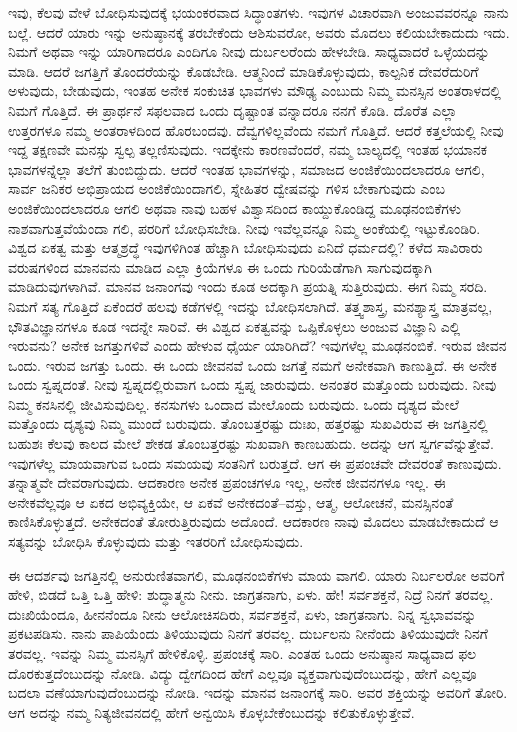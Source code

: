 ಇವು, ಕೆಲವು ವೇಳೆ ಬೋಧಿಸುವುದಕ್ಕೆ ಭಯಂಕರವಾದ ಸಿದ್ಧಾಂತಗಳು. ಇವುಗಳ ವಿಚಾರವಾಗಿ ಅಂಜುವವರನ್ನೂ ನಾನು ಬಲ್ಲೆ. ಆದರೆ ಯಾರು ಇನ್ನು ಅನುಷ್ಠಾನಕ್ಕೆ ತರಬೇಕೆಂದು ಆಶಿಸುವರೋ, ಅವರು ಮೊದಲು ಕಲಿಯಬೇಕಾದುದು ಇದು. ನಿಮಗೆ ಅಥವಾ ಇನ್ನು ಯಾರಿಗಾದರೂ ಎಂದಿಗೂ ನೀವು ದುರ್ಬಲರೆಂದು ಹೇಳಬೇಡಿ. ಸಾಧ್ಯವಾದರೆ ಒಳ್ಳೆಯದನ್ನು ಮಾಡಿ. ಆದರೆ ಜಗತ್ತಿಗೆ ತೊಂದರೆಯನ್ನು ಕೊಡಬೇಡಿ. ಆತ್ಮನಿಂದೆ ಮಾಡಿಕೊಳ್ಳುವುದು, ಕಾಲ್ಪನಿಕ ದೇವರೆದುರಿಗೆ ಅಳುವುದು, ಬೇಡುವುದು, ಇಂತಹ ಅನೇಕ ಸಂಕುಚಿತ ಭಾವಗಳು ಮೌಢ್ಯ ಎಂಬುದು ನಿಮ್ಮ ಮನಸ್ಸಿನ ಅಂತರಾಳದಲ್ಲಿ ನಿಮಗೆ ಗೊತ್ತಿದೆ. ಈ ಪ್ರಾರ್ಥನೆ ಸಫಲವಾದ ಒಂದು ದೃಷ್ಟಾಂತ ವನ್ನಾದರೂ ನನಗೆ ಕೊಡಿ. ದೊರೆತ ಎಲ್ಲಾ ಉತ್ತರಗಳೂ ನಮ್ಮ ಅಂತರಾಳದಿಂದ ಹೊರಬಂದವು. ದೆವ್ವಗಳಿಲ್ಲವೆಂದು ನಮಗೆ ಗೊತ್ತಿದೆ. ಆದರೆ ಕತ್ತಲೆಯಲ್ಲಿ ನೀವು ಇದ್ದ ತಕ್ಷಣವೇ ಮನಸ್ಸು ಸ್ವಲ್ಪ ತಲ್ಲಣಿಸುವುದು. ಇದಕ್ಕೇನು ಕಾರಣವೆಂದರೆ, ನಮ್ಮ ಬಾಲ್ಯದಲ್ಲಿ ಇಂತಹ ಭಯಾನಕ ಭಾವಗಳನ್ನೆಲ್ಲಾ ತಲೆಗೆ ತುಂಬಿದ್ದುದು. ಆದರೆ ಇಂತಹ ಭಾವಗಳನ್ನು, ಸಮಾಜದ ಅಂಜಿಕೆಯಿಂದಲಾದರೂ ಆಗಲಿ, ಸಾರ್ವ ಜನಿಕರ ಅಭಿಪ್ರಾಯದ ಅಂಜಿಕೆಯಿಂದಾಗಲಿ, ಸ್ನೇಹಿತರ ದ್ವೇಷವನ್ನು ಗಳಿಸ ಬೇಕಾಗುವುದು ಎಂಬ ಅಂಜಿಕೆಯಿಂದಲಾದರೂ ಆಗಲಿ ಅಥವಾ ನಾವು ಬಹಳ ವಿಶ್ವಾಸದಿಂದ ಕಾಯ್ದುಕೊಂಡಿದ್ದ ಮೂಢನಂಬಿಕೆಗಳು ನಾಶವಾಗುತ್ತವೆಯೆಂದಾ ಗಲಿ, ಪರರಿಗೆ ಬೋಧಿಸಬೇಡಿ. ನೀವು ಇವೆಲ್ಲವನ್ನೂ ನಿಮ್ಮ ಅಂಕೆಯಲ್ಲಿ ಇಟ್ಟುಕೊಂಡಿರಿ. ವಿಶ್ವದ ಏಕತ್ವ ಮತ್ತು ಆತ್ಮಶ್ರದ್ಧೆ ಇವುಗಳಿಗಿಂತ ಹೆಚ್ಚಾಗಿ ಬೋಧಿಸುವುದು ಏನಿದೆ ಧರ್ಮದಲ್ಲಿ? ಕಳೆದ ಸಾವಿರಾರು ವರುಷಗಳಿಂದ ಮಾನವನು ಮಾಡಿದ ಎಲ್ಲಾ ಕ್ರಿಯೆಗಳೂ ಈ ಒಂದು ಗುರಿಯೆಡೆಗಾಗಿ ಸಾಗುವುದಕ್ಕಾಗಿ ಮಾಡಿದುವುಗಳಾಗಿವೆ. ಮಾನವ ಜನಾಂಗವು ಇಂದು ಕೂಡ ಅದಕ್ಕಾಗಿ ಪ್ರಯತ್ನಿ ಸುತ್ತಿರುವುದು. ಈಗ ನಿಮ್ಮ ಸರದಿ. ನಿಮಗೆ ಸತ್ಯ ಗೊತ್ತಿದೆ ಏಕೆಂದರೆ ಹಲವು ಕಡೆಗಳಲ್ಲಿ ಇದನ್ನು ಬೋಧಿಸಲಾಗಿದೆ. ತತ್ತ್ವಶಾಸ್ತ್ರ, ಮನಶ್ಯಾಸ್ತ್ರ ಮಾತ್ರವಲ್ಲ, ಭೌತವಿಜ್ಞಾನಗಳೂ ಕೂಡ ಇದನ್ನೇ ಸಾರಿವೆ. ಈ ವಿಶ್ವದ ಏಕತ್ವವನ್ನು ಒಪ್ಪಿಕೊಳ್ಳಲು ಅಂಜುವ ವಿಜ್ಞಾನಿ ಎಲ್ಲಿ ಇರುವನು? ಅನೇಕ ಜಗತ್ತುಗಳಿವೆ ಎಂದು ಹೇಳುವ ಧೈರ್ಯ ಯಾರಿಗಿದೆ? ಇವುಗಳೆಲ್ಲ ಮೂಢನಂಬಿಕೆ. ಇರುವ ಜೀವನ ಒಂದು. ಇರುವ ಜಗತ್ತು ಒಂದು. ಈ ಒಂದು ಜೀವನವೆ ಒಂದು ಜಗತ್ತೆ ನಮಗೆ ಅನೇಕವಾಗಿ ಕಾಣುತ್ತಿದೆ. ಈ ಅನೇಕ ಒಂದು ಸ್ವಪ್ನದಂತೆ. ನೀವು ಸ್ವಪ್ನದಲ್ಲಿರುವಾಗ ಒಂದು ಸ್ವಪ್ನ ಜಾರುವುದು. ಅನಂತರ ಮತ್ತೊಂದು ಬರುವುದು. ನೀವು ನಿಮ್ಮ ಕನಸಿನಲ್ಲಿ ಜೀವಿಸುವುದಿಲ್ಲ. ಕನಸುಗಳು ಒಂದಾದ ಮೇಲೊಂದು ಬರುವುದು. ಒಂದು ದೃಶ್ಯದ ಮೇಲೆ ಮತ್ತೊಂದು ದೃಶ್ಯವು ನಿಮ್ಮ ಮುಂದೆ ಬರುವುದು. ತೊಂಬತ್ತರಷ್ಟು ದುಃಖ, ಹತ್ತರಷ್ಟು ಸುಖವಿರುವ ಈ ಜಗತ್ತಿನಲ್ಲಿ ಬಹುಶಃ ಕೆಲವು ಕಾಲದ ಮೇಲೆ ಶೇಕಡ ತೊಂಬತ್ತರಷ್ಟು ಸುಖವಾಗಿ ಕಾಣಬಹುದು. ಅದನ್ನು ಆಗ ಸ್ವರ್ಗವೆನ್ನುತ್ತೇವೆ. ಇವುಗಳೆಲ್ಲ ಮಾಯವಾಗುವ ಒಂದು ಸಮಯವು ಸಂತನಿಗೆ ಬರುತ್ತದೆ. ಆಗ ಈ ಪ್ರಪಂಚವೇ ದೇವರಂತೆ ಕಾಣುವುದು. ತನ್ನಾತ್ಮವೇ ದೇವರಾಗುವುದು. ಆದಕಾರಣ ಅನೇಕ ಪ್ರಪಂಚಗಳೂ ಇಲ್ಲ, ಅನೇಕ ಜೀವನಗಳೂ ಇಲ್ಲ. ಈ ಅನೇಕವೆಲ್ಲವೂ ಆ ಏಕದ ಅಭಿವ್ಯಕ್ತಿಯೇ, ಆ ಏಕವೆ ಅನೇಕದಂತೆ–ವಸ್ತು, ಆತ್ಮ, ಆಲೋಚನೆ, ಮನಸ್ಸಿನಂತೆ ಕಾಣಿಸಿಕೊಳ್ಳುತ್ತದೆ. ಅನೇಕದಂತೆ ತೋರುತ್ತಿರುವುದು ಅದೊಂದೆ. ಆದಕಾರಣ ನಾವು ಮೊದಲು ಮಾಡಬೇಕಾದುದೆ ಆ ಸತ್ಯವನ್ನು ಬೋಧಿಸಿ ಕೊಳ್ಳುವುದು ಮತ್ತು ಇತರರಿಗೆ ಬೋಧಿಸುವುದು.

ಈ ಆದರ್ಶವು ಜಗತ್ತಿನಲ್ಲಿ ಅನುರುಣಿತವಾಗಲಿ, ಮೂಢನಂಬಿಕೆಗಳು ಮಾಯ ವಾಗಲಿ. ಯಾರು ನಿರ್ಬಲರೋ ಅವರಿಗೆ ಹೇಳಿ, ಬಿಡದೆ ಒತ್ತಿ ಒತ್ತಿ ಹೇಳಿ: ಶುದ್ಧಾತ್ಮನು ನೀನು. ಜಾಗ್ರತನಾಗು, ಏಳು. ಹೇ! ಸರ್ವಶಕ್ತನೆ, ನಿದ್ರೆ ನಿನಗೆ ತರವಲ್ಲ. ದುಃಖಿಯೆಂದೂ, ಹೀನನೆಂದೂ ನೀನು ಆಲೋಚಿಸದಿರು, ಸರ್ವಶಕ್ತನೆ, ಏಳು, ಜಾಗ್ರತನಾಗು. ನಿನ್ನ ಸ್ವಭಾವವನ್ನು ಪ್ರಕಟಪಡಿಸು. ನಾನು ಪಾಪಿಯೆಂದು ತಿಳಿಯುವುದು ನಿನಗೆ ತರವಲ್ಲ. ದುರ್ಬಲನು ನೀನೆಂದು ತಿಳಿಯುವುದೇ ನಿನಗೆ ತರವಲ್ಲ. ಇವನ್ನು ನಿಮ್ಮ ಮನಸ್ಸಿಗೆ ಹೇಳಿಕೊಳ್ಳಿ. ಪ್ರಪಂಚಕ್ಕೆ ಸಾರಿ. ಎಂತಹ ಒಂದು ಅನುಷ್ಠಾನ ಸಾಧ್ಯವಾದ ಫಲ ದೊರಕುತ್ತದೆಂಬುದನ್ನು ನೋಡಿ. ವಿದ್ಯು ದ್ವೇಗದಿಂದ ಹೇಗೆ ಎಲ್ಲವೂ ವ್ಯಕ್ತವಾಗುವುದೆಂಬುದನ್ನು, ಹೇಗೆ ಎಲ್ಲವೂ ಬದಲಾ ವಣೆಯಾಗುವುದೆಂಬುದನ್ನು ನೋಡಿ. ಇದನ್ನು ಮಾನವ ಜನಾಂಗಕ್ಕೆ ಸಾರಿ. ಅವರ ಶಕ್ತಿಯನ್ನು ಅವರಿಗೆ ತೋರಿ. ಆಗ ಅದನ್ನು ನಮ್ಮ ನಿತ್ಯಜೀವನದಲ್ಲಿ ಹೇಗೆ ಅನ್ವಯಿಸಿ ಕೊಳ್ಳಬೇಕೆಂಬುದನ್ನು ಕಲಿತುಕೊಳ್ಳುತ್ತೇವೆ.


